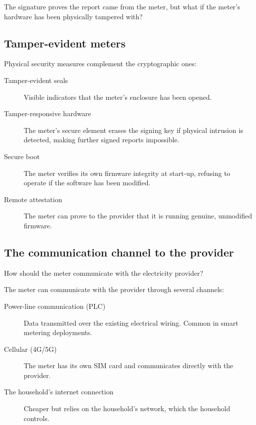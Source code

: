\begin{exercise}
  The signature proves the report came from the meter, but what if the
  meter's hardware has been physically tampered with?
\end{exercise}

\subsection{Tamper-evident meters}

Physical security measures complement the cryptographic ones:
\begin{description}
  \item[Tamper-evident seals] Visible indicators that the meter's enclosure
    has been opened.
  \item[Tamper-responsive hardware] The meter's secure element erases the
    signing key if physical intrusion is detected, making further signed
    reports impossible.
  \item[Secure boot] The meter verifies its own firmware integrity at
    start-up, refusing to operate if the software has been modified.
  \item[Remote attestation] The meter can prove to the provider that it is
    running genuine, unmodified firmware.
\end{description}

\subsection{The communication channel to the provider}

\begin{exercise}
  How should the meter communicate with the electricity provider?
\end{exercise}

The meter can communicate with the provider through several channels:
\begin{description}
  \item[Power-line communication (PLC)] Data transmitted over the
    existing electrical wiring.
    Common in smart metering deployments.
  \item[Cellular (4G/5G)] The meter has its own SIM card and
    communicates directly with the provider.
  \item[The household's internet connection] Cheaper but relies
    on the household's network, which the household controls.
\end{description}

